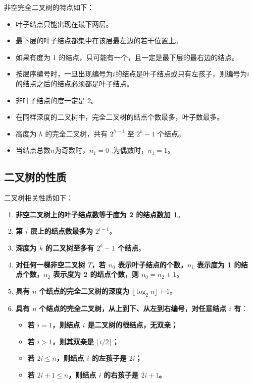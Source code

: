 \documentclass[lang=cn,newtx,10pt,scheme=chinese]{elegantbook}
\begin{document}
非空完全二叉树的特点如下：

\begin{itemize}
  \item 叶子结点只能出现在最下两层。
  \item 最下层的叶子结点都集中在该层最左边的若干位置上。
  \item 如果有度为 1 的结点，只可能有一个，且一定是最下层的最右边的结点。
  \item 按层序编号时，一旦出现编号为$i$的结点是叶子结点或只有左孩子，则编号为$i$的结点之后的结点必须都是叶子结点。
  \item 非叶子结点的度一定是 2。
  \item 在同样深度的二叉树中，完全二叉树的结点个数最多，叶子数最多。
  \item 高度为 $h$ 的完全二叉树，共有 $2^{h-1}$ 至 $2^h - 1$ 个结点。
  \item 当结点总数$n$为奇数时，$n_1 = 0$ ,为偶数时，$n_1 = 1$。
  \end{itemize}

\subsection{二叉树的性质}

二叉树相关性质如下：

\begin{enumerate}
  \item \textbf{非空二叉树上的叶子结点数等于度为 2 的结点数加 1}。
  \item \textbf{第 $i$ 层上的结点数最多为 $2^{i-1}$}。
  \item \textbf{深度为 $k$ 的二叉树至多有 $2^k - 1$ 个结点}。
  \item \textbf{对任何一棵非空二叉树 $T$，若 $n_0$ 表示叶子结点的个数，$n_1$ 表示度为 1 的结点个数，$n_2$ 表示度为 2 的结点个数，则 $n_0 = n_2 + 1$}。
  \item \textbf{具有 $n$ 个结点的完全二叉树的深度为 $\lfloor \log_2 n \rfloor + 1$}。
  \item \textbf{具有 $n$ 个结点的完全二叉树，从上到下、从左到右编号，对任意结点 $i$ 有}：
  \begin{itemize}
    \item \textbf{若 $i = 1$，则结点 $i$ 是二叉树的根结点，无双亲；}
    \item \textbf{若 $i > 1$，则其双亲是 $\lfloor i/2 \rfloor$；}
    \item \textbf{若 $2i \leq n$，则结点 $i$ 的左孩子是 $2i$；}
    \item \textbf{若 $2i + 1 \leq n$，则结点 $i$ 的右孩子是 $2i + 1$。}
  \end{itemize}
\end{enumerate}
\end{document}
